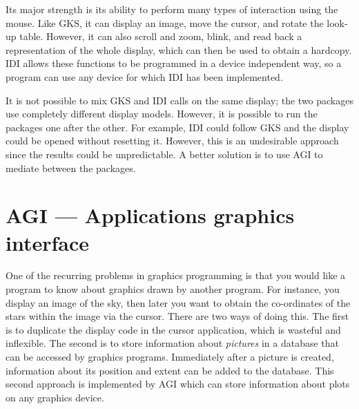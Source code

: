 Its major strength is its ability to perform many types of interaction using the
mouse.
Like GKS, it can display an image, move the cursor, and rotate the look-up
table.
However, it can also scroll and zoom, blink, and read back a representation of
the whole display, which can then be used to obtain a hardcopy.
IDI allows these functions to be programmed in a device independent way, so
a program can use any device for which IDI has been implemented.

It is not possible to mix GKS and IDI calls on the same display; the two
packages use completely different display models.
However, it is possible to run the packages one after the other.
For example, IDI could follow GKS and the display could be opened without
resetting it.
However, this is an undesirable approach since the results could be
unpredictable.
A better solution is to use AGI to mediate between the packages.

\section{AGI --- Applications graphics interface}

One of the recurring problems in graphics programming is that you would
like a program to know about graphics drawn by another program.
For instance, you display an image of the sky, then later you want to obtain
the co-ordinates of the stars within the image via the cursor.
There are two ways of doing this.
The first is to duplicate the display code in the cursor application, which is
wasteful and inflexible.
The second is to store information about {\em pictures} in a database that can
be accessed by graphics programs.
Immediately after a picture is created, information about its position and
extent can be added to the database.
This second approach is implemented by AGI which can store information about
plots on any graphics device.

